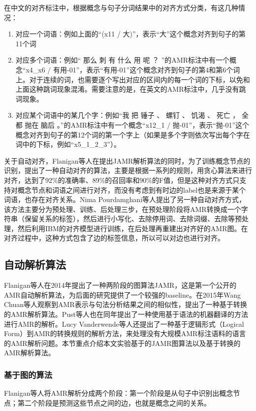 \documentclass[master, winfont]{njuthesis}
\begin{document}
在中文的对齐标注中，根据概念与句子分词结果中的对齐方式分类，有这几种情况：
\begin{enumerate}
	\item 对应一个词语：例如上面的“(x11 / 大)”，表示“大”这个概念对齐到句子的第11个词
	\item 对应多个词语：例如“ 那么 刺 有 什么 用 呢 ？ ”的AMR标注中有一个概念“x4\_x6 / 有用-01”，表示“有用-01”这个概念对齐到句子的第4和第6个词上。对于连续的词，也需要逐个写出对应的区间内的每一个词的下标，以免和上面这种跳词现象混淆。需要注意的是，在英文的AMR标注中，几乎没有跳词现象。
	\item 对应某个词语中的某几个字：例如“我 把 锤子 、 螺钉 、 饥渴 、 死亡 ， 全都 抛在 脑后 。”的AMR标注中有一个概念“x12\_1 / 抛-01”，表示“抛-01”这个概念对齐到句子的第12个词的第一个字上（如果是多个字则依次写出每个字在词中的下标，例如“x5\_1\_2\_3”）。
\end{enumerate}

关于自动对齐，Flanigan等人\cite{Flanigan2014}在提出JAMR解析算法的同时，为了训练概念节点的识别，提出了一种自动对齐的算法，主要是根据一系列的规则，用贪心算法来进行对齐，达到了92\%的准确率、89\%的召回率和90\%的F值，但是这种对齐方式只支持对概念节点和词语之间进行对齐，而没有考虑到有时边的label也是来源于某个词语，也存在对齐关系。Nima Pourdamghani等人\cite{Pourdamghani2014}提出了另一种自动对齐方式，该方法主要分为预处理、训练、后处理三步，在预处理阶段将AMR转换成一个字符串（保留关系的标签），然后进行小写化、去除停用词、去除词缀、去除等预处理，然后利用IBM的对齐模型进行训练，在后处理再重建出对齐好的AMR图。在对齐过程中，这种方式包含了边的标签信息，所以可以对边也进行对齐。


\subsection{自动解析算法}
Flanigan等人\cite{Flanigan2014}在2014年提出了一种两阶段的图算法JAMR，这是第一个公开的AMR自动解析算法，为后面的研究提供了一个较强的baseline。在2015年Wang Chuan\cite{Wang2015}等人观察到AMR表示与句法分析结果之间的相似性，提出了一种基于转换的AMR解析算法。Pust等人\cite{Pust2015}也在同年提出了一种使用基于语法的机器翻译的方法进行AMR的解析。Lucy Vanderwende等人\cite{Vanderwende2015}还提出了一种基于逻辑形式（Logical Form）到AMR的转换规则的解析方法，来处理没有大规模AMR标注语料的语言的AMR解析问题。本节重点介绍本文实验基于的JAMR图算法以及基于转换的AMR解析算法。

\subsubsection{基于图的算法}
Flanigan等人\cite{Flanigan2014}将AMR解析分成两个阶段：第一个阶段是从句子中识别出概念节点；第二个阶段是预测这些节点之间的边，也就是概念之间的关系。
\end{document}
